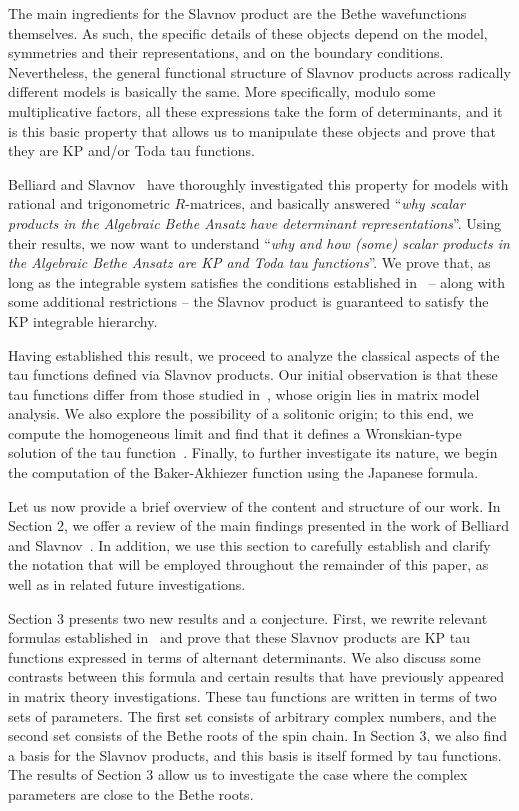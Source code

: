 \documentclass[a4paper,11pt]{amsart}
\begin{document}
The main ingredients for the Slavnov product are the Bethe
wavefunctions themselves. As such, the specific details of these
objects depend on the model, symmetries and their representations, and
on the boundary conditions. Nevertheless, the general
functional structure of Slavnov products across radically
different models is basically the same. More specifically, modulo some
multiplicative factors, all these expressions take the form of
determinants, and it is this basic property that allows us to
manipulate these objects and prove that they are KP and/or Toda tau
functions.

Belliard and Slavnov~\cite{Belliard:2019bfz} have thoroughly
investigated this property for models with rational and trigonometric
\(R\)-matrices, and basically answered ``\emph{why scalar products in
the Algebraic Bethe Ansatz have determinant representations}''. Using
their results, we now want to understand ``\emph{why and how (some)
scalar products in the Algebraic Bethe Ansatz are KP and Toda tau
functions}''. We prove that, as long as the integrable system
satisfies the conditions established in~\cite{Belliard:2019bfz} --
along with some additional restrictions -- the Slavnov product is
guaranteed to satisfy the KP integrable hierarchy.

Having established this result, we proceed to analyze the classical
aspects of the tau functions defined via Slavnov products. Our initial
observation is that these tau functions differ from those studied
in~\cite{Segal:1985aga, Kharchev:1991cy, Alexandrov:2014cwa}, whose
origin lies in matrix model analysis. We also explore the possibility
of a solitonic origin; to this end, we compute the homogeneous limit
and find that it defines a Wronskian-type solution of the tau
function~\cite{Kodama2018}. Finally, to further investigate its
nature, we begin the computation of the Baker-Akhiezer function using
the Japanese formula.

Let us now provide a brief overview of the content and structure of
our work. In Section 2, we offer a review of the main findings
presented in the work of Belliard and
Slavnov~\cite{Belliard:2019bfz}. In addition, we use this section to
carefully establish and clarify the notation that will be employed
throughout the remainder of this paper, as well as in related future
investigations.

Section 3 presents two new results and a conjecture. First, we rewrite
relevant formulas established in~\cite{Belliard:2019bfz} and prove
that these Slavnov products are KP tau functions expressed in terms of
alternant determinants. We also discuss some contrasts between this
formula and certain results that have previously appeared in matrix
theory investigations.  These tau functions are written in terms of
two sets of parameters. The first set consists of arbitrary complex
numbers, and the second set consists of the Bethe roots of the spin
chain. In Section 3, we also find a basis for the Slavnov products,
and this basis is itself formed by tau functions. The results of
Section 3 allow us to investigate the case where the complex
parameters are close to the Bethe roots.
\end{document}
